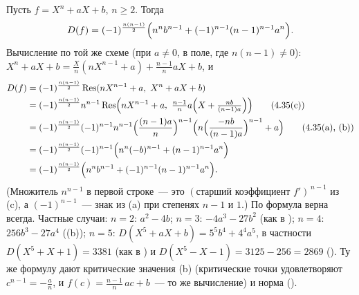 \begin{example}[4.39]
Пусть $f=X^n+aX+b$, $n\ge2$. Тогда
\[
D(f)=(-1)^{\frac{n(n-1)}2}\Bigl(n^nb^{n-1}+(-1)^{n-1}(n-1)^{n-1}a^n\Bigr).
\]
Вычисление по той же схеме (при $a\ne0$, в поле, где $n(n-1)\ne0$): $X^n+aX+b=\frac Xn(nX^{n-1}+a)+\frac{n-1}naX+b$, и
\begin{align*}
D(f)&=(-1)^{\frac{n(n-1)}2}\operatorname{Res}(nX^{n-1}+a,\ X^n+aX+b)\\
&=(-1)^{\frac{n(n-1)}2}n^{n-1}\operatorname{Res}\Bigl(nX^{n-1}+a,\ \tfrac{n-1}na\Bigl(X+\tfrac{nb}{(n-1)a}\Bigr)\Bigr)
\qquad\text{(4.35(c))}\\
&=(-1)^{\frac{n(n-1)}2}(-1)^{n-1}n^{n-1}\Bigl(\frac{(n-1)a}n\Bigr)^{n-1}\Bigl(n\Bigl(\frac{-nb}{(n-1)a}\Bigr)^{n-1}+a\Bigr)
\qquad\text{(4.35(a), (b))}\\
&=(-1)^{\frac{n(n-1)}2}(-1)^{n-1}\Bigl(n^n(-b)^{n-1}+(n-1)^{n-1}a^n\Bigr)\\
&=(-1)^{\frac{n(n-1)}2}\Bigl(n^nb^{n-1}+(-1)^{n-1}(n-1)^{n-1}a^n\Bigr).
\end{align*}
(Множитель $n^{n-1}$ в первой строке~--- это $(\text{старший коэффициент } f')^{\,n-1}$ из (c), а $(-1)^{n-1}$~--- знак из
(a) при степенях $n-1$ и $1$.) По  формула верна всегда. Частные случаи: $n=2$: $a^2-4b$; $n=3$: $-4a^3-27b^2$ (как в ); $n=4$:
$256b^3-27a^4$ ((b)); $n=5$: $D(X^5+aX+b)=5^5b^4+4^4a^5$, в частности $D(X^5+X+1)=3381$ (как в ) и
$D(X^5-X-1)=3125-256=2869$ (). Ту же формулу дают критические значения (b) (критические точки удовлетворяют
$c^{n-1}=-\frac an$, и $f(c)=\frac{n-1}n\,ac+b$~--- то же вычисление) и норма ().
\end{example}
